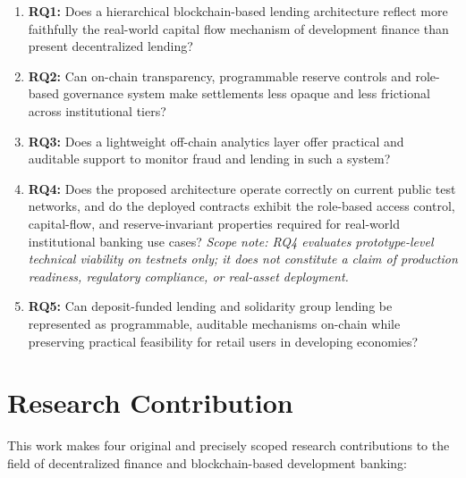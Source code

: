 \documentclass[12pt,a4paper]{report}
\begin{document}
\begin{enumerate}[noitemsep]
\item \textbf{RQ1:} Does a hierarchical blockchain-based lending architecture reflect more faithfully the real-world capital flow mechanism of development finance than present decentralized lending?
\item \textbf{RQ2:} Can on-chain transparency, programmable reserve controls and role-based governance system make settlements less opaque and less frictional across institutional tiers?
\item \textbf{RQ3:} Does a lightweight off-chain analytics layer offer practical and auditable support to monitor fraud and lending in such a system?
\item \textbf{RQ4:} Does the proposed architecture operate correctly on current public test networks, and do the deployed contracts exhibit the role-based access control, capital-flow, and reserve-invariant properties required for real-world institutional banking use cases? \textit{Scope note: RQ4 evaluates prototype-level technical viability on testnets only; it does not constitute a claim of production readiness, regulatory compliance, or real-asset deployment.}
\item \textbf{RQ5:} Can deposit-funded lending and solidarity group lending be represented as programmable, auditable mechanisms on-chain while preserving practical feasibility for retail users in developing economies?
\end{enumerate}

\section{Research Contribution}
\label{sec:research-contribution}

This work makes four original and precisely scoped research contributions to the field of decentralized finance and blockchain-based development banking:
\end{document}
